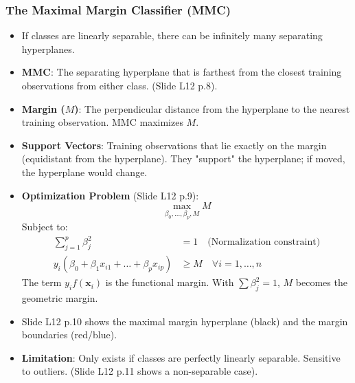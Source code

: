 \documentclass[12pt,a4paper]{article}
\begin{document}
    \subsubsection{The Maximal Margin Classifier (MMC)}
        \begin{itemize}
            \item If classes are linearly separable, there can be infinitely many separating hyperplanes.
            \item \textbf{MMC}: The separating hyperplane that is farthest from the closest training observations from either class. (Slide L12 p.8).
            \item \textbf{Margin ($M$)}: The perpendicular distance from the hyperplane to the nearest training observation. MMC maximizes $M$.
            \item \textbf{Support Vectors}: Training observations that lie exactly on the margin (equidistant from the hyperplane). They "support" the hyperplane; if moved, the hyperplane would change.
            \item \textbf{Optimization Problem} (Slide L12 p.9):
                $$ \max_{\beta_0, \dots, \beta_p, M} M $$
                Subject to:
                \begin{align}
                    \sum_{j=1}^p \beta_j^2 &= 1 \quad \text{(Normalization constraint)} \\
                    y_i (\beta_0 + \beta_1 x_{i1} + \dots + \beta_p x_{ip}) &\ge M \quad \forall i=1, \dots, n
                \end{align}
                The term $y_i f(\mathbf{x}_i)$ is the functional margin. With $\sum \beta_j^2 = 1$, $M$ becomes the geometric margin.
            \item Slide L12 p.10 shows the maximal margin hyperplane (black) and the margin boundaries (red/blue).
            \item \textbf{Limitation}: Only exists if classes are perfectly linearly separable. Sensitive to outliers. (Slide L12 p.11 shows a non-separable case).
        \end{itemize}
\end{document}
